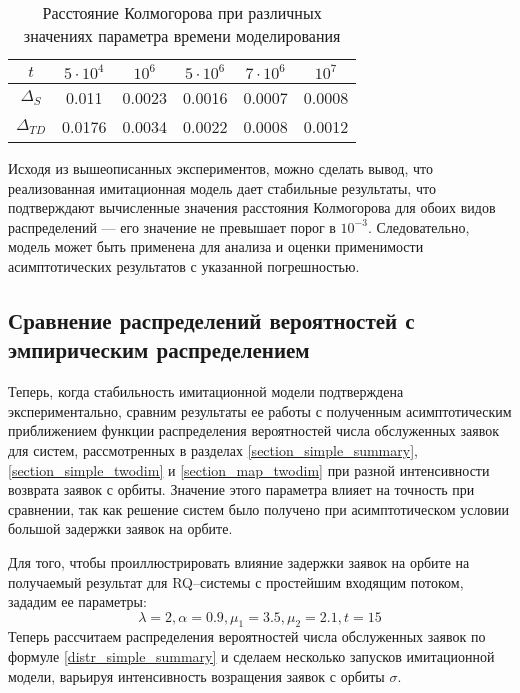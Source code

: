 \begin{table}[h!] 
	\centering
	\caption{Расстояние Колмогорова при различных значениях параметра времени моделирования}
	\label{time_dynamics}
	\begin{tabular}{| c | c | c | c | c | c |} 
		\hline
		$t$ & $5\cdot 10^4$ & $10^6$ & $5\cdot 10^6$ & $7\cdot 10^6$ & $10^7$\\ 
		\hline
		$\Delta_S$ & 0.011 & 0.0023 & 0.0016 & 0.0007 & 0.0008\\
		\hline
		$\Delta_{TD}$ & 0.0176 & 0.0034 & 0.0022 & 0.0008 & 0.0012\\
		\hline
	\end{tabular}
\end{table} 

Исходя из вышеописанных экспериментов, можно сделать вывод, что реализованная имитационная модель дает стабильные результаты, что подтверждают вычисленные значения расстояния Колмогорова для обоих видов распределений --- его значение не превышает порог в $10^{-3}$. Следовательно, модель может быть применена для анализа и оценки применимости асимптотических результатов с указанной погрешностью.
\subsection{Сравнение распределений вероятностей с эмпирическим распределением}
Теперь, когда стабильность имитационной модели подтверждена экспериментально, сравним результаты ее работы с полученным асимптотическим приближением функции распределения вероятностей числа обслуженных заявок для систем, рассмотренных в разделах \ref{section_simple_summary}, \ref{section_simple_twodim} и \ref{section_map_twodim} при разной интенсивности возврата заявок с орбиты. Значение этого параметра влияет на точность при сравнении, так как решение систем было получено при асимптотическом условии большой задержки заявок на орбите.

Для того, чтобы проиллюстрировать влияние задержки заявок на орбите на получаемый результат для RQ--системы с простейшим входящим потоком, зададим ее параметры:
\begin{equation} \label{simple_summary_input_params}
	\lambda = 2,
	\alpha = 0.9,
	\mu_{1} = 3.5,
	\mu_{2} = 2.1, 
	t = 15
\end{equation}
Теперь рассчитаем распределения вероятностей числа обслуженных заявок по формуле \eqref{distr_simple_summary} и сделаем несколько запусков имитационной модели, варьируя интенсивность возращения заявок с орбиты $\sigma$.


